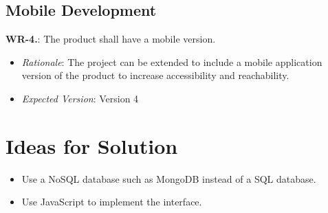 \documentclass[12pt]{article}
\begin{document}
\subsection{Mobile Development}
\textbf{WR-4.}: The product shall have a mobile version.
\begin{itemize}
  \item \emph{Rationale}: The project can be extended to include a mobile application version of the product to increase accessibility and reachability.
  \item \emph{Expected Version}: Version 4
\end{itemize}

\section{Ideas for Solution}
\begin{itemize}
  \item Use a NoSQL database such as MongoDB instead of a SQL database.
  \item Use JavaScript to implement the interface. 
\end{itemize}

\newpage{}
\end{document}
